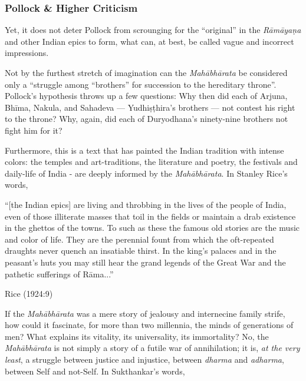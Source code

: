 \subsubsection{Pollock \& Higher Criticism}\label{sec1.1.1.2}

Yet, it does not deter Pollock from scrounging for the “original” in the {\sl Rāmāyaṇa} and other Indian epics to form, what can, at best, be called vague and incorrect impressions. 

Not by the furthest stretch of imagination can the {\sl Mahābhārata} be considered only a “struggle among “brothers” for succession to the hereditary throne”. Pollock’s hypothesis throws up a few questions: Why then did each of Arjuna, Bhīma, Nakula, and Sahadeva --- Yudhiṣṭhira’s brothers --- not contest his right to the throne? Why, again, did each of Duryodhana’s ninety-nine brothers not fight him for it? 

Furthermore, this is a text that has painted the Indian tradition with intense colors: the temples and art-traditions, the literature and poetry, the festivals and daily-life of India - are deeply informed by the {\sl Mahābhārata}. In Stanley Rice’s words,

\begin{myquote}
“[the Indian epics] are living and throbbing in the lives of the people of India, even of those illiterate masses that toil in the fields or maintain a drab existence in the ghettos of the towns. To such as these the famous old stories are the music and color of life. They are the perennial fount from which the oft-repeated draughts never quench an insatiable thirst. In the king's palaces and in the peasant's huts you may still hear the grand legends of the Great War and the pathetic sufferings of Rāma...”

\hfill Rice (1924:9)
\end{myquote}

If the {\sl Mahābhārata} was a mere story of jealousy and internecine family strife, how could it fascinate, for more than two millennia, the minds of generations of men? What explains its vitality, its universality, its immortality? No, the {\sl Mahābhārata} is not simply a story of a futile war of annihilation; it is, {\sl at the very least}, a struggle between justice and injustice, between {\sl dharma} and {\sl adharma}, between Self and not-Self. In Sukthankar’s words,

